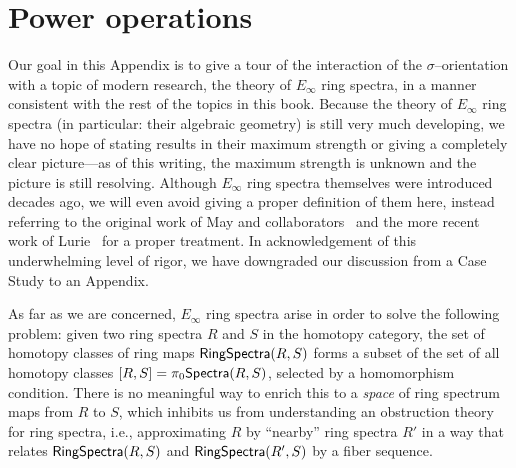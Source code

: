 


\chapter{Power operations}\label{PowerOpnsChapter}

Our goal in this Appendix is to give a tour of the interaction of the $\sigma$--orientation with a topic of modern research, the theory of $E_\infty$ ring spectra, in a manner consistent with the rest of the topics in this book.  Because the theory of $E_\infty$ ring spectra (in particular: their algebraic geometry) is still very much developing, we have no hope of stating results in their maximum strength or giving a completely clear picture---as of this writing, the maximum strength is unknown and the picture is still resolving.  Although $E_\infty$ ring spectra themselves were introduced decades ago, we will even avoid giving a proper definition of them here, instead referring to the original work of May and collaborators~\cite{EKMM} and the more recent work of Lurie~\cite[Chapter 7]{LurieHA} for a proper treatment.  In acknowledgement of this underwhelming level of rigor, we have downgraded our discussion from a Case Study to an Appendix.

As far as we are concerned, $E_\infty$ ring spectra arise in order to solve the following problem: given two ring spectra $R$ and $S$ in the homotopy category, the set of homotopy classes of ring maps $\mathsf{RingSpectra}(R, S)$ forms a subset of the set of all homotopy classes $[R, S] = \pi_0 \mathsf{Spectra}(R, S)$, selected by a homomorphism condition.  There is no meaningful way to enrich this to a \emph{space} of ring spectrum maps from $R$ to $S$, which inhibits us from understanding an obstruction theory for ring spectra, i.e., approximating $R$ by ``nearby'' ring spectra $R'$ in a way that relates $\mathsf{RingSpectra}(R, S)$ and $\mathsf{RingSpectra}(R', S)$ by a fiber sequence.


